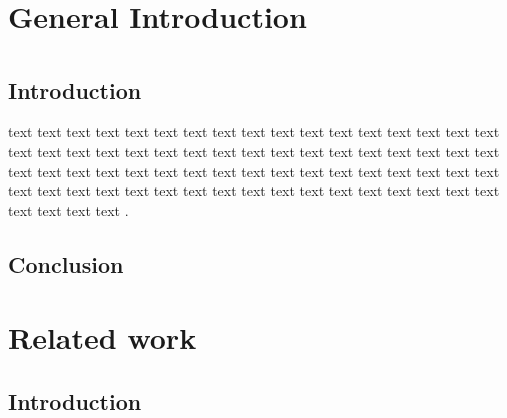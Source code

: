 \documentclass[12pt,a4paper]{report}
\begin{document}
\chapter*{General Introduction}
\begin{sloppypar}


\newpage
\chapter{}
\section{Introduction}
text text text text text text text text text text text text text text text text text text text text text text text text text text text text text text text text text text text text text text text text text text text text text text text text text text text text text text text text text text text text text text text text text text text text text text text text 
\cite{patil2013medical}   \cite{pham2000current}.

\section{}
\section{}


\section{Conclusion}

\chapter{Related work}
\setcounter{secnumdepth}{3}
\section{Introduction}
 

\end{sloppypar}
\end{document}
